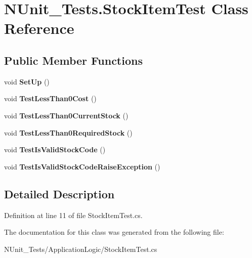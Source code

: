 \hypertarget{class_n_unit___tests_1_1_stock_item_test}{
\section{NUnit\_\-Tests.StockItemTest Class Reference}
\label{class_n_unit___tests_1_1_stock_item_test}
}
\subsection*{Public Member Functions}
\begin{DoxyCompactItemize}
\item 
\hypertarget{class_n_unit___tests_1_1_stock_item_test_a4fe0abc153226b053191895c7cc64e51}{
void {\bfseries SetUp} ()}
\label{class_n_unit___tests_1_1_stock_item_test_a4fe0abc153226b053191895c7cc64e51}

\item 
\hypertarget{class_n_unit___tests_1_1_stock_item_test_a728d5f08771af3fc901e1f7374609cc1}{
void {\bfseries TestLessThan0Cost} ()}
\label{class_n_unit___tests_1_1_stock_item_test_a728d5f08771af3fc901e1f7374609cc1}

\item 
\hypertarget{class_n_unit___tests_1_1_stock_item_test_a7acaa26c18515fa27f2434f925371e24}{
void {\bfseries TestLessThan0CurrentStock} ()}
\label{class_n_unit___tests_1_1_stock_item_test_a7acaa26c18515fa27f2434f925371e24}

\item 
\hypertarget{class_n_unit___tests_1_1_stock_item_test_a8b04f62aa4146430094a92da5530cf55}{
void {\bfseries TestLessThan0RequiredStock} ()}
\label{class_n_unit___tests_1_1_stock_item_test_a8b04f62aa4146430094a92da5530cf55}

\item 
\hypertarget{class_n_unit___tests_1_1_stock_item_test_ae60865db78931b53647081f1488a66e2}{
void {\bfseries TestIsValidStockCode} ()}
\label{class_n_unit___tests_1_1_stock_item_test_ae60865db78931b53647081f1488a66e2}

\item 
\hypertarget{class_n_unit___tests_1_1_stock_item_test_aa383a701bf8ef64631c29ac11e429dbd}{
void {\bfseries TestIsValidStockCodeRaiseException} ()}
\label{class_n_unit___tests_1_1_stock_item_test_aa383a701bf8ef64631c29ac11e429dbd}

\end{DoxyCompactItemize}


\subsection{Detailed Description}


Definition at line 11 of file StockItemTest.cs.



The documentation for this class was generated from the following file:\begin{DoxyCompactItemize}
\item 
NUnit\_\-Tests/ApplicationLogic/StockItemTest.cs\end{DoxyCompactItemize}
